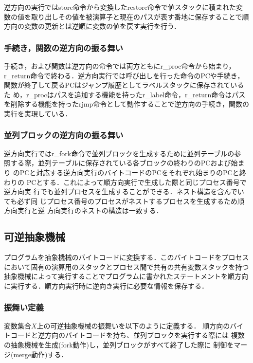 \documentclass[submit,PRO]{ipsj}
\begin{document}
逆方向の実行ではstore命令から変換したrestore命令で値スタックに積まれた変
数の値を取り出しその値を被演算子と現在のパスが表す番地に保存することで順
方向の変数の更新とは逆順に変数の値を戻す実行を行う．

\subsubsection{手続き，関数の逆方向の振る舞い}

手続き，および関数は逆方向の命令では両方ともにr\_proc命令から始まり，
r\_return命令で終わる．逆方向実行では呼び出しを行った命令のPCや手続き，
関数が終了して戻るPCはジャンプ履歴としてラベルスタックに保存されているた
め，r\_procはパスを追加する機能を持ったr\_label命令，r\_return命令はパス
を削除する機能を持ったrjmp命令として動作することで逆方向の手続き，関数の
実行を実現している．

\subsubsection{並列ブロックの逆方向の振る舞い}

逆方向実行ではr\_fork命令で並列ブロックを生成するために並列テーブルの参
照する際，並列テーブルに保存されている各ブロックの終わりのPCおよび始まり
のPCと対応する逆方向実行のバイトコードのPCをそれぞれ始まりのPCと終わりの
PCとする．これによって順方向実行で生成した際と同じプロセス番号で逆方向実
行でも並列プロセスを生成することができる．ネスト構造を含んでいても必ず同
じプロセス番号のプロセスがネストするプロセスを生成するため順方向実行と逆
方向実行のネストの構造は一致する．

\subsection{可逆抽象機械}
\label{sec:format}

プログラムを抽象機械のバイトコードに変換する．このバイトコードをプロセスにおいて固有の演算用のスタックとプロセス間で共有の共有変数スタックを持つ抽象機械によって実行することでプログラムに書かれたステートメントを順方向に実行する．順方向実行時に逆向き実行に必要な情報を保存する．

\subsubsection{振舞い定義}

変数集合$X$上の可逆抽象機械の振舞いを以下のように定義する．
順方向のバイトコードと逆方向のバイトコードを持ち、並列ブロックを実行する際には
複数の抽象機械を生成(fork動作)し，並列ブロックがすべて終了した際に
制御をマージ(merge動作)する．
\end{document}
